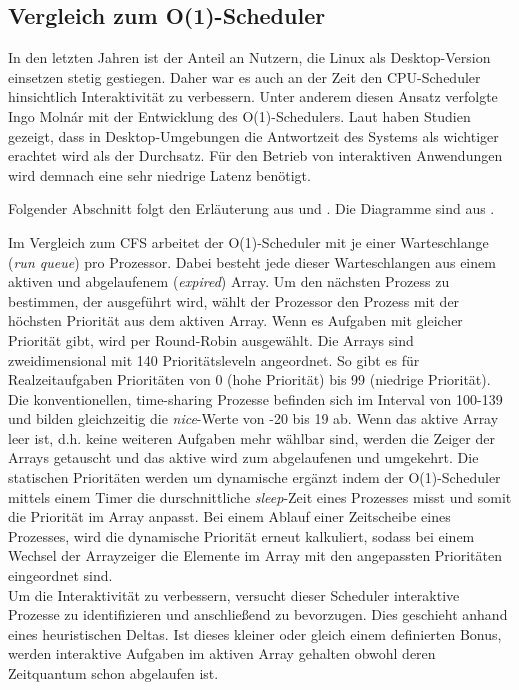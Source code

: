 \subsection{Vergleich zum O(1)-Scheduler}\label{s:compO1}
In den letzten Jahren ist der Anteil an Nutzern, die Linux als Desktop-Version einsetzen stetig gestiegen. Daher war es auch an der Zeit den CPU-Scheduler hinsichtlich Interaktivität zu verbessern. Unter anderem diesen Ansatz verfolgte Ingo Molnár mit der Entwicklung des O(1)-Sche\-dulers. Laut \cite{papercomparison} haben Studien gezeigt, dass in Desktop-Umgebungen die Antwortzeit des Systems als wichtiger erachtet wird als der Durchsatz. Für den Betrieb von interaktiven Anwendungen wird demnach eine sehr niedrige Latenz benötigt. 

Folgender Abschnitt folgt den Erläuterung aus \cite{asilberschatz} und \cite{papercomparison}. Die Diagramme sind aus \cite{papercomparison}.

Im Vergleich zum CFS arbeitet der O(1)-Scheduler mit je einer Warteschlange (\textit{run queue}) pro Prozessor. Dabei besteht jede dieser Warteschlangen aus einem aktiven und abgelaufenem (\textit{expired}) Array. Um den nächsten Prozess zu bestimmen, der ausgeführt wird, wählt der Prozessor den Prozess mit der höchsten Priorität aus dem aktiven Array. Wenn es Aufgaben mit gleicher Priorität gibt, wird per Round-Robin ausgewählt. Die Arrays sind zweidimensional mit 140 Prioritätsleveln angeordnet. So gibt es für Realzeitaufgaben Prioritäten von 0 (hohe Priorität) bis 99 (niedrige Priorität). Die konventionellen, time-shar\-ing Prozesse befinden sich im Interval von 100-139 und bilden gleichzeitig die \textit{nice}-Werte von -20 bis 19 ab. Wenn das aktive Array leer ist, d.h. keine weiteren Aufgaben mehr wählbar sind, werden die Zeiger der Arrays getauscht und das aktive wird zum abgelaufenen und umgekehrt. Die statischen Prioritäten werden um dynamische ergänzt indem der O(1)-Scheduler mittels einem Timer die durschnittliche \textit{sleep}-Zeit eines Prozesses misst und somit die Priorität im Array anpasst. Bei einem Ablauf einer Zeitscheibe eines Prozesses, wird die dynamische Priorität erneut kalkuliert, sodass bei einem Wechsel der Arrayzeiger die Elemente im Array mit den angepassten Prioritäten eingeordnet sind. \\
Um die Interaktivität zu verbessern, versucht dieser Scheduler  interaktive Prozesse zu identifizieren und anschließend zu bevorzugen. Dies geschieht anhand eines heu\-ris\-tisch\-en Deltas. Ist dieses kleiner oder gleich einem definierten Bonus, werden interaktive Aufgaben im aktiven Array gehalten obwohl deren Zeitquantum schon abgelaufen ist.

